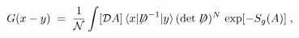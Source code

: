 \begin{equation}\label{eq:defg1}
G(x-y) \;=\; \frac{1}{{\mathcal N}} \int [{\mathcal D}A] \,
\langle x| {\not \!\! D}^{-1} |y \rangle \, (\det \not \!\! D)^N \,
\exp [ - S_g(A) ] \;,
\end{equation}

